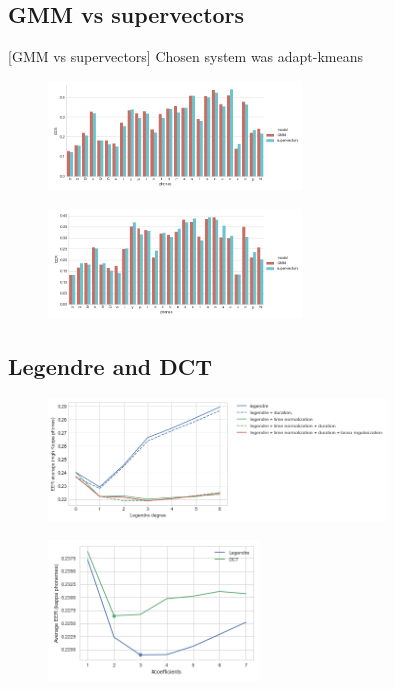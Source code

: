 \subsection{GMM vs supervectors}

[GMM vs supervectors] Chosen system was adapt-kmeans

\begin{figure}[H]
	\centering
	\includegraphics[width=0.6\textwidth]{files/figures/results/gmm-vs-supervectors/gmm-vs-supervectors-dev.png}
\end{figure}

\begin{figure}[H]
	\centering
	\includegraphics[width=0.6\textwidth]{files/figures/results/gmm-vs-supervectors/gmm-vs-supervectors-heldout.png}
\end{figure}


\subsection{Legendre and DCT}

\begin{figure}[H]
	\centering
	\includegraphics[width=0.8\textwidth]{files/figures/results/legendre-dct/legendre-tunning.png}
\end{figure}


\begin{figure}[H]
	\centering
	\includegraphics[width=0.5\textwidth]{files/figures/results/legendre-dct/legendre-dct-coefficients.png}
\end{figure}


